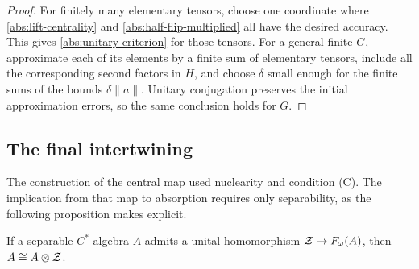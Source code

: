 \begin{proof}
For finitely many elementary tensors, choose one coordinate where
\eqref{abs:lift-centrality} and
\eqref{abs:half-flip-multiplied} all have the desired accuracy.
This gives \eqref{abs:unitary-criterion} for those tensors.
For a general finite $G$, approximate each of its elements by a
finite sum of elementary tensors, include all the corresponding
second factors in $H$, and choose $\delta$ small enough for the
finite sums of the bounds $\delta\|a\|$.  Unitary conjugation
preserves the initial approximation errors, so the same conclusion
holds for $G$.
\end{proof}

\subsection{The final intertwining}

The construction of the central map used nuclearity and condition
\textup{(C)}. The implication from that map to absorption requires
only separability, as the following proposition makes explicit.

\begin{proposition}\label{prop:absorption}
If a separable $C^*$-algebra $A$ admits a unital homomorphism
$\mathcal Z\to F_\omega(A)$, then $A\cong A\otimes\mathcal Z$.

\end{proposition}

